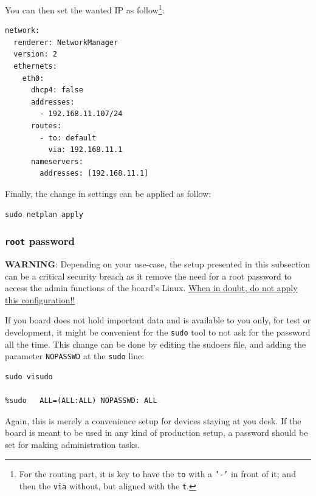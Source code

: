 \documentclass[10pt]{article}
\begin{document}
You can then set the wanted IP as follow\footnote{For the routing part, it is key to have the \texttt{to} with a \texttt{'-'} in front of
it; and then the \texttt{via} without, but aligned with the \texttt{t}.}:
\begin{verbatim}
network:
  renderer: NetworkManager
  version: 2
  ethernets:
    eth0:
      dhcp4: false
      addresses:
        - 192.168.11.107/24
      routes:
        - to: default
          via: 192.168.11.1
      nameservers:
        addresses: [192.168.11.1]
\end{verbatim}

Finally, the change in settings can be applied
as follow:

\begin{verbatim}
sudo netplan apply
\end{verbatim}

\subsubsection{\texttt{root} password}
\label{sec:orge94563c}
\begin{tcolorbox}[colback=orange!5!white,colframe=orange!75!black]
\textbf{WARNING}: Depending on your use-case, the setup presented in this
subsection can be a critical security breach as it remove the need for a root
password to access the admin functions of the board's Linux.
\uline{When in doubt, do not apply this configuration!!}
\end{tcolorbox}

If you board does not hold important data
and is available to you only, for test or development,
it might be convenient for the \texttt{sudo} tool to not ask for the
password all the time.
This change can be done by editing the sudoers file, and
adding the parameter \texttt{NOPASSWD}
at the \texttt{sudo} line:

\begin{verbatim}
sudo visudo

%sudo   ALL=(ALL:ALL) NOPASSWD: ALL
\end{verbatim}

Again, this is merely a convenience setup for devices staying at you desk. If
the board is meant to be used in any kind of production setup, a password
should be set for making administration tasks.
\end{document}
